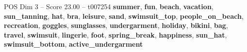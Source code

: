 \begin{textsample}{POS Dim 3 – Score 23.00 – t007254}  \label{ex:f3_pos_013}
\textbf{summer}, \textbf{fun}, \textbf{beach}, \textbf{vacation}, \textbf{sun\_tanning}, \textbf{hat}, \textbf{bra}, \textbf{leisure}, \textbf{sand}, \textbf{swimsuit\_top}, \textbf{people\_on\_beach}, \textbf{recreation}, \textbf{goggles}, \textbf{sunglasses}, \textbf{undergarment}, \textbf{holiday}, \textbf{bikini}, \textbf{bag}, \textbf{travel}, \textbf{swimsuit}, \textbf{lingerie}, \textbf{foot}, \textbf{spring\_break}, \textbf{happiness}, \textbf{sun\_hat}, \textbf{swimsuit\_bottom}, \textbf{active\_undergarment}

\end{textsample}
